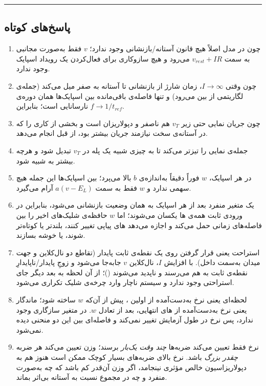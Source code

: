\documentclass[11pt,a4paper]{article}
\begin{document}
\vspace{0.3cm}
\begin{center}\rule{0.4\textwidth}{0.4pt}\end{center}

\newpage

\subsection*{پاسخ‌های کوتاه}
{\small
	\begin{enumerate}[itemsep=4pt, leftmargin=1.6em]
		\item چون در مدل اصلاً هیچ قانون آستانه/بازنشانی وجود ندارد؛ $v$ فقط به‌صورت مجانبی به سمت $v_{rest}+IR$ می‌رود و هیچ سازوکاری برای فعال‌کردن یک رویداد اسپایک وجود ندارد.
		\item چون وقتی $I\to\infty$، زمان شارژ از بازنشانی تا آستانه به صفر میل می‌کند
		(جمله‌ی لگاریتمی از بین می‌رود)
		و تنها فاصله‌ی باقی‌مانده بین اسپایک‌ها همان دوره‌ی نارسانایی است؛ بنابراین
		$f \to 1/t_{ref}$.
		\item چون جریان نمایی حتی زیر $v_T$ هم ناصفر و دپولاریزان است و بخشی از کاری را که در آستانه‌ی سخت نیازمند جریان بیشتر بود، از قبل انجام می‌دهد.
		\item جمله‌ی نمایی را تیزتر می‌کند تا به چیزی شبیه یک پله در $v_T$ تبدیل شود و  هرچه بیشتر به  شبیه شود.
		\item در هر اسپایک، $w$ فوراً دقیقاً به‌اندازه‌ی $b$ بالا می‌پرد؛ بین اسپایک‌ها این جمله هیچ سهمی ندارد و $w$ فقط به سمت $a(v-E_L)$ آرام می‌گیرد.
		\item یک متغیر منفرد بعد از هر اسپایک به همان وضعیت بازنشانی می‌شود، بنابراین در ورودی ثابت همه‌ی ها یکسان می‌شوند؛ اما $w$ حافظه‌ی شلیک‌های اخیر را بین فاصله‌های زمانی حمل می‌کند و اجازه می‌دهد های پیاپی تغییر کنند، بلندتر یا کوتاه‌تر شوند، یا خوشه بسازند.
		\item استراحت یعنی قرار گرفتن روی یک نقطه‌ی ثابت پایدار
		(تقاطع دو نال‌کلاین و جهت میدان به‌سمت داخل).
		با افزایش $I$، نال‌کلاین $v$ جابه‌جا می‌شود و زوجِ پایدار/ناپایدارِ نقطه‌ی ثابت به هم می‌رسند و ناپدید می‌شوند
		()؛
		از آن لحظه به بعد دیگر جای استراحتی وجود ندارد و سیستم ناچار وارد چرخه‌ی شلیک تکراری می‌شود.
		\item لحظه‌ای یعنی نرخ به‌دست‌آمده از اولین ، پیش از آن‌که $w$ ساخته شود؛ ماندگار یعنی نرخ به‌دست‌آمده از های انتهایی، بعد از تعادل $w$. در  متغیر سازگاری وجود ندارد، پس نرخ در طول آزمایش تغییر نمی‌کند و فاصله‌ای بین این دو منحنی دیده نمی‌شود.
		\item نرخ فقط تعیین می‌کند ضربه‌ها \emph{چند وقت یک‌بار} برسند؛ وزن تعیین می‌کند هر ضربه \emph{چقدر بزرگ} باشد. نرخ بالای ضربه‌های بسیار کوچک ممکن است هنوز هم به دپولاریزاسیون خالص مؤثری نینجامد، اگر وزن آن‌قدر کم باشد که چه به‌صورت منفرد و چه در مجموع نسبت به آستانه بی‌اثر بماند.

\end{enumerate}}
\end{document}
